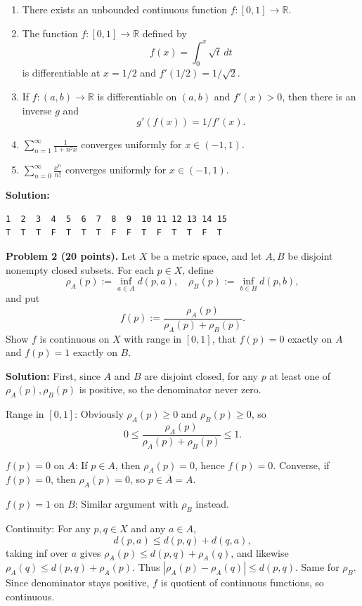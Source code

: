 \documentclass[12pt]{article}
\begin{document}
\begin{enumerate}[label=\textbf{(T / F) \arabic*.}, leftmargin=*]
  \item There exists an unbounded continuous function $f:[0,1]\to\mathbb{R}$.
  \item The function $f:[0,1]\to\mathbb{R}$ defined by
    \[ f(x)=\int_0^x \sqrt{t}\,dt \]
    is differentiable at $x=1/2$ and $f'(1/2)=1/\sqrt{2}$.
  \item If $f:(a,b)\to\mathbb{R}$ is differentiable on $(a,b)$ and $f'(x)>0$, then there is an inverse $g$ and
    \[ g'(f(x))=1/f'(x). \]
  \item $\displaystyle\sum_{n=1}^\infty\frac{1}{1+n^2x}$ converges uniformly for $x\in(-1,1)$.
  \item $\displaystyle\sum_{n=0}^\infty\frac{x^n}{n!}$ converges uniformly for $x\in(-1,1)$.
\end{enumerate}

\noindent\textbf{Solution:}
\begin{verbatim}
1  2  3  4  5  6  7  8  9  10 11 12 13 14 15
T  T  T  F  T  T  T  F  F  T  F  T  T  F  T
\end{verbatim}

\newpage

\noindent\textbf{Problem 2 (20 points).} Let $X$ be a metric space, and let $A,B$ be disjoint nonempty closed subsets. For each $p\in X$, define
\[
  \rho_A(p):=\inf_{a\in A} d(p,a),\quad
  \rho_B(p):=\inf_{b\in B} d(p,b),
\]
and put
\[ f(p):=\frac{\rho_A(p)}{\rho_A(p)+\rho_B(p)}. \]
Show $f$ is continuous on $X$ with range in $[0,1]$, that $f(p)=0$ exactly on $A$ and $f(p)=1$ exactly on $B$.

\medskip

\noindent\textbf{Solution:} First, since $A$ and $B$ are disjoint closed, for any $p$ at least one of $\rho_A(p),\rho_B(p)$ is positive, so the denominator never zero.

\medskip

\noindent Range in $[0,1]$: Obviously $\rho_A(p)\ge0$ and $\rho_B(p)\ge0$, so
\[
0 \le \frac{\rho_A(p)}{\rho_A(p)+\rho_B(p)} \le1.
\]

\medskip

\noindent $f(p)=0$ on $A$: If $p\in A$, then $\rho_A(p)=0$, hence $f(p)=0$. Converse, if $f(p)=0$, then $\rho_A(p)=0$, so $p\in\overline A=A$.

\medskip

\noindent $f(p)=1$ on $B$: Similar argument with $\rho_B$ instead.

\medskip

\noindent Continuity: For any $p,q\in X$ and any $a\in A$,
\[
d(p,a)\le d(p,q)+d(q,a),
\]
taking inf over $a$ gives $\rho_A(p)\le d(p,q)+\rho_A(q)$, and likewise
$\rho_A(q)\le d(p,q)+\rho_A(p)$. Thus $|\rho_A(p)-\rho_A(q)|\le d(p,q)$.
Same for $\rho_B$. Since denominator stays positive, $f$ is quotient of continuous functions, so continuous.
\end{document}
